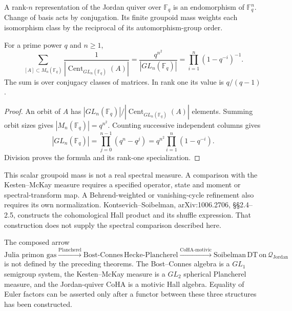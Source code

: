 A rank-\(n\) representation of the Jordan quiver over
\(\mathbb F_q\) is an endomorphism of \(\mathbb F_q^n\).
Change of basis acts by conjugation. Its finite groupoid mass weights
each isomorphism class by the reciprocal of its automorphism-group order.

\begin{proposition}
\label{v4-arith:thm:KS-CoHA-adelic}
For a prime power \(q\) and \(n\geq1\),
\[
 \sum_{[A]\subset M_n(\mathbb F_q)}
 \frac{1}{|\operatorname{Cent}_{GL_n(\mathbb F_q)}(A)|}
 =\frac{q^{n^2}}{|GL_n(\mathbb F_q)|}
 =\prod_{i=1}^n(1-q^{-i})^{-1}.
\]
The sum is over conjugacy classes of matrices. In rank one its value
is \(q/(q-1)\).
\end{proposition}
\begin{proof}
An orbit of \(A\) has
\(|GL_n(\mathbb F_q)|/|\operatorname{Cent}_{GL_n(\mathbb F_q)}(A)|\)
elements. Summing orbit sizes gives \(|M_n(\mathbb F_q)|=q^{n^2}\).
Counting successive independent columns gives
\[
 |GL_n(\mathbb F_q)|=\prod_{j=0}^{n-1}(q^n-q^j)
 =q^{n^2}\prod_{i=1}^n(1-q^{-i}).
\]
Division proves the formula and its rank-one specialization.
\end{proof}

This scalar groupoid mass is not a real spectral measure.
A comparison with the Kesten--McKay measure requires a specified
operator, state and moment or spectral-transform map. A Behrend-weighted
or vanishing-cycle refinement also requires its own normalization.
Kontsevich--Soibelman, arXiv:1006.2706, \S\S2.4--2.5, constructs the
cohomological Hall product and its shuffle expression. That construction
does not supply the spectral comparison described here.

\begin{proposition}
\label{v4-arith:prop:HY-BC-Soibelman-dictionary}
The composed arrow
\begin{equation*}
\text{Julia primon gas}
\xrightarrow{\text{Plancherel}}
\mathrm{Bost\text{-}Connes\,Hecke\text{-}Plancherel}
\xrightarrow{\text{CoHA-motivic}}
\mathrm{Soibelman\,DT\,on}\,\mathcal{Q}_{\mathrm{Jordan}}
\end{equation*}
is not defined by the preceding theorems. The Bost--Connes algebra is
a \(GL_{1}\) semigroup system, the Kesten--McKay measure is a
\(GL_{2}\) spherical Plancherel measure, and the Jordan-quiver CoHA is
a motivic Hall algebra. Equality of Euler factors can be asserted only
after a functor between these three structures has been constructed.
\end{proposition}

